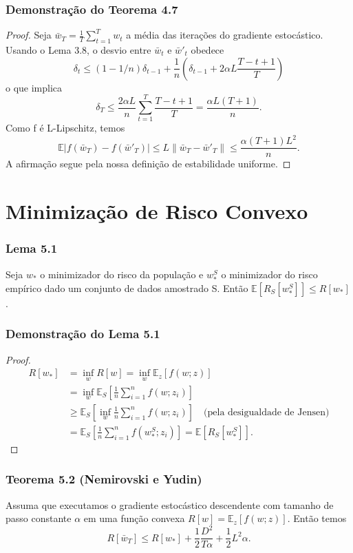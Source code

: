 \documentclass{beamer}
\newcommand{\EE}{\mathbb{E}}
\begin{document}
\begin{frame}
\frametitle{Demonstração do Teorema 4.7}
\begin{proof}
Seja \(\bar{w}_T = \frac{1}{T}\sum_{t=1}^T w_t\) a média das iterações do gradiente estocástico.  Usando o Lema 3.8, o desvio entre \(\bar{w}_t\) e \(\bar{w}'_t\) obedece
$$ \delta_t \le (1-1/n)\delta_{t-1} + \frac{1}{n}(\delta_{t-1} + 2\alpha L \frac{T-t+1}{T}) $$ 
o que implica
$$ \delta_T \le \frac{2\alpha L}{n} \sum_{t=1}^T \frac{T-t+1}{T} = \frac{\alpha L(T+1)}{n}. $$ 
Como f é L-Lipschitz, temos
$$ \EE|f(\bar{w}_T) - f(\bar{w}'_T)| \le L\|\bar{w}_T - \bar{w}'_T\| \le \frac{\alpha(T+1)L^2}{n}. $$ 
A afirmação segue pela nossa definição de estabilidade uniforme.
\end{proof}
\end{frame}

\section{Minimização de Risco Convexo}
\begin{frame}
\tableofcontents[currentsection]
\end{frame}

\begin{frame}
\frametitle{Lema 5.1}
\begin{lemma}
Seja \(w_*\) o minimizador do risco da população e \(w_*^S\) o minimizador do risco empírico dado um conjunto de dados amostrado S. Então \(\EE[R_S[w_*^S]] \le R[w_*]\). 
\end{lemma}
\end{frame}

\begin{frame}
\frametitle{Demonstração do Lema 5.1}
\begin{proof}
\begin{align*}
R[w_*] &= \inf_w R[w] = \inf_w \EE_z[f(w;z)] \\
&= \inf_w \EE_S[\frac{1}{n}\sum_{i=1}^n f(w;z_i)] \\
&\ge \EE_S[\inf_w \frac{1}{n}\sum_{i=1}^n f(w;z_i)] \quad \text{(pela desigualdade de Jensen)} \\
&= \EE_S[\frac{1}{n}\sum_{i=1}^n f(w_*^S;z_i)] = \EE[R_S[w_*^S]].
\end{align*} 
\end{proof}
\end{frame}

\begin{frame}
\frametitle{Teorema 5.2 (Nemirovski e Yudin)}
\begin{theorem}
Assuma que executamos o gradiente estocástico descendente com tamanho de passo constante \(\alpha\) em uma função convexa \(R[w]=\EE_z[f(w;z)]\).  Então temos
$$ R[\bar{w}_T] \le R[w_*] + \frac{1}{2}\frac{D^2}{T\alpha} + \frac{1}{2}L^2\alpha. $$ 
\end{theorem}
\end{frame}
\end{document}
